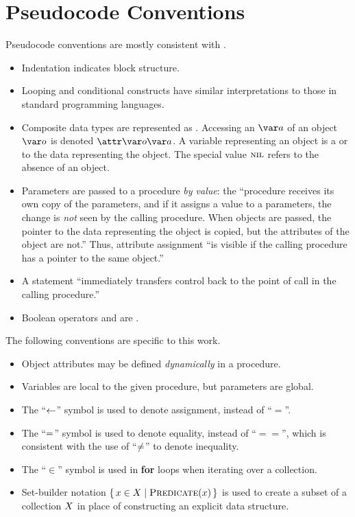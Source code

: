 \chapter{Pseudocode Conventions}\label{ch:pseudocode-conventions}

Pseudocode conventions are mostly consistent with \citet{Cormen2022}.
\begin{itemize}
  \item Indentation indicates block structure.
  \item Looping and conditional constructs have similar interpretations to those in standard programming languages.
  \item Composite data types are represented as . Accessing an  $\vSomeAttribute$ of an object $\vSomeObject$ is denoted
  $\aSomeObjectAttribute$. A variable representing an object is a  or  to the data representing the object. The special value
  $\textsc{nil}$ refers to the absence of an object.
  \item Parameters are passed to a procedure \emph{by value}: the ``procedure receives its own copy of the parameters, and if it assigns a value to a parameters, the change is \emph{not} seen by the calling procedure. When objects are passed, the pointer to the data representing the object is copied, but the attributes of the object are not.'' Thus, attribute assignment ``is visible if the calling procedure has a pointer to the same object.''
  \item A {\Return} statement ``immediately transfers control back to the point of call in the calling procedure.''
  \item Boolean operators {\AND} and {\OR} are .
\end{itemize}
The following conventions are specific to this work.
\begin{itemize}
  \item Object attributes may be defined \emph{dynamically} in a procedure.
  \item Variables are local to the given procedure, but parameters are global.
  \item The ``$\leftarrow$'' symbol is used to denote assignment, instead of ``$=$''.
  \item The ``$=$'' symbol is used to denote equality, instead of ``$==$'', which is consistent with the use of ``$\neq$'' to denote inequality.
  \item The ``$\in$'' symbol is used in \textbf{for} loops when iterating over a collection.
  \item Set-builder notation $\setBuilder{\vSomeElement \in \vSomeSet}{\cPredicate[\vSomeElement]}$ is used to create a subset of a collection $X$ in place of constructing an explicit data structure.
\end{itemize}